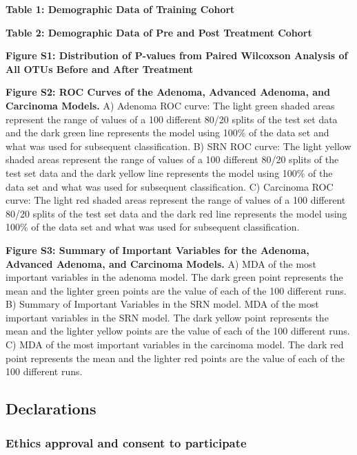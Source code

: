 \documentclass[12pt,]{article}
\begin{document}
\newpage

\textbf{Table 1: Demographic Data of Training Cohort}

\textbf{Table 2: Demographic Data of Pre and Post Treatment Cohort}

\newpage

\textbf{Figure S1: Distribution of P-values from Paired Wilcoxson
Analysis of All OTUs Before and After Treatment}

\textbf{Figure S2: ROC Curves of the Adenoma, Advanced Adenoma, and
Carcinoma Models.} A) Adenoma ROC curve: The light green shaded areas
represent the range of values of a 100 different 80/20 splits of the
test set data and the dark green line represents the model using 100\%
of the data set and what was used for subsequent classification. B) SRN
ROC curve: The light yellow shaded areas represent the range of values
of a 100 different 80/20 splits of the test set data and the dark yellow
line represents the model using 100\% of the data set and what was used
for subsequent classification. C) Carcinoma ROC curve: The light red
shaded areas represent the range of values of a 100 different 80/20
splits of the test set data and the dark red line represents the model
using 100\% of the data set and what was used for subsequent
classification.

\textbf{Figure S3: Summary of Important Variables for the Adenoma,
Advanced Adenoma, and Carcinoma Models.} A) MDA of the most important
variables in the adenoma model. The dark green point represents the mean
and the lighter green points are the value of each of the 100 different
runs. B) Summary of Important Variables in the SRN model. MDA of the
most important variables in the SRN model. The dark yellow point
represents the mean and the lighter yellow points are the value of each
of the 100 different runs. C) MDA of the most important variables in the
carcinoma model. The dark red point represents the mean and the lighter
red points are the value of each of the 100 different runs.

\newpage

\subsection{Declarations}\label{declarations}

\subsubsection{Ethics approval and consent to
participate}\label{ethics-approval-and-consent-to-participate}
\end{document}
